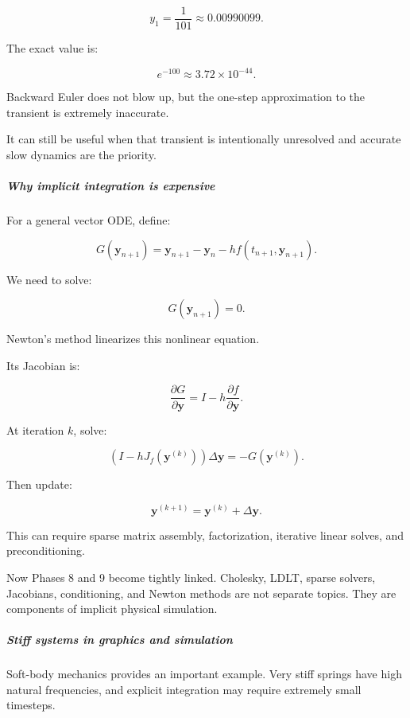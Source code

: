 \[
y_1=\frac1{101}\approx0.00990099.
\]

The exact value is:

\[
e^{-100}\approx3.72\times10^{-44}.
\]

Backward Euler does not blow up, but the one-step approximation to the transient is extremely inaccurate.

It can still be useful when that transient is intentionally unresolved and accurate slow dynamics are the priority.

\subparagraph{Why implicit integration is expensive}\label{02-foundations-ii-ch025-why-implicit-integration-is-expensive}

\hypertarget{02-foundations-ii-ch025-why-implicit-integration-is-expensive}{}

For a general vector ODE, define:

\[
G(\mathbf y_{n+1}) = \mathbf y_{n+1}-\mathbf y_n -hf(t_{n+1},\mathbf y_{n+1}).
\]

We need to solve:

\[
G(\mathbf y_{n+1})=0.
\]

Newton's method linearizes this nonlinear equation.

Its Jacobian is:

\[
\frac{\partial G}{\partial\mathbf y} = I-h\frac{\partial f}{\partial\mathbf y}.
\]

At iteration \(k\), solve:

\[
\boxed{ \left(I-hJ_f(\mathbf y^{(k)})\right)\Delta\mathbf y = -G(\mathbf y^{(k)}) }.
\]

Then update:

\[
\mathbf y^{(k+1)}=\mathbf y^{(k)}+\Delta\mathbf y.
\]

This can require sparse matrix assembly, factorization, iterative linear solves, and preconditioning.

Now Phases 8 and 9 become tightly linked. Cholesky, LDLT, sparse solvers, Jacobians, conditioning, and Newton methods are not separate topics. They are components of implicit physical simulation.

\subparagraph{Stiff systems in graphics and simulation}\label{02-foundations-ii-ch025-stiff-systems-in-graphics-and-simulation}

\hypertarget{02-foundations-ii-ch025-stiff-systems-in-graphics-and-simulation}{}

Soft-body mechanics provides an important example. Very stiff springs have high natural frequencies, and explicit integration may require extremely small timesteps.

